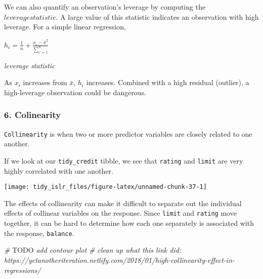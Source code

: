 \documentclass[]{book}
\newenvironment{Shaded}{\begin{snugshade}}{\end{snugshade}}
\newcommand{\AlertTok}[1]{\textcolor[rgb]{0.94,0.16,0.16}{#1}}
\newcommand{\CommentTok}[1]{\textcolor[rgb]{0.56,0.35,0.01}{\textit{#1}}}
\newcommand{\DataTypeTok}[1]{\textcolor[rgb]{0.13,0.29,0.53}{#1}}
\newcommand{\KeywordTok}[1]{\textcolor[rgb]{0.13,0.29,0.53}{\textbf{#1}}}
\newcommand{\NormalTok}[1]{#1}
\newcommand{\OperatorTok}[1]{\textcolor[rgb]{0.81,0.36,0.00}{\textbf{#1}}}
\newcommand{\StringTok}[1]{\textcolor[rgb]{0.31,0.60,0.02}{#1}}
\begin{document}
We can also quantify an observation's leverage by computing the \(leverage statistic\). A large value of this statistic indicates an observation with high leverage. For a simple linear regression,

\(h_i = \frac{1}{n} + \frac{x_i - \bar{x}^2}{\sum_{i'=1}^{n}}\)

\emph{leverage statistic}

As \(x_i\) increases from \(\bar{x}\), \(h_i\) increases. Combined with a high residual (outlier), a high-leverage observation could be dangerous.

\hypertarget{colinearity}{%
\subsubsection{6. Colinearity}\label{colinearity}}

\texttt{Collinearity} is when two or more predictor variables are closely related to one another.

If we look at our \texttt{tidy\_credit} tibble, we see that \texttt{rating} and \texttt{limit} are very highly correlated with one another.

\begin{Shaded}
\end{Shaded}

\begin{center}\texttt{[image: tidy\_islr\_files/figure-latex/unnamed-chunk-37-1]} \end{center}

The effects of collinearity can make it difficult to separate out the individual effects of collinear variables on the response. Since \texttt{limit} and \texttt{rating} move together, it can be hard to determine how each one separately is associated with the response, \texttt{balance}.

\begin{Shaded}
\begin{Highlighting}[]
\CommentTok{# }\AlertTok{TODO}\CommentTok{ add contour plot}
\CommentTok{# clean up what this link did: https://yetanotheriteration.netlify.com/2018/01/high-collinearity-effect-in-regressions/}
\end{Highlighting}
\end{Shaded}
\end{document}

